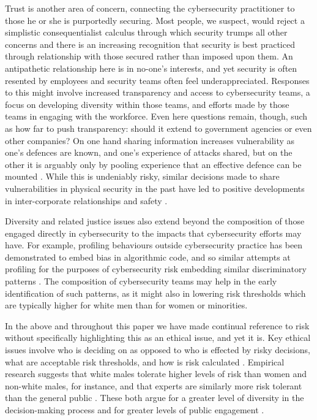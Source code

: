 \documentclass{svjour3}                     %
\begin{document}
Trust is another area of concern, connecting the cybersecurity practitioner to those he or she is purportedly securing. Most people, we suspect, would reject a simplistic consequentialist calculus through which security trumps all other concerns and there is an increasing recognition that security is best practiced through relationship with those secured rather than imposed upon them. An antipathetic relationship here is in no-one’s interests, and yet security is often resented by employees and security teams often feel underappreciated. Responses to this might involve increased transparency and access to cybersecurity teams, a focus on developing diversity within those teams, and efforts made by those teams in engaging with the workforce. Even here questions remain, though, such as how far to push transparency: should it extend to government agencies or even other companies? On one hand sharing information increases vulnerability as one’s defences are known, and one’s experience of attacks shared, but on the other it is arguably only by pooling experience that an effective defence can be mounted \cite[p.89--111]{guiora2017cybersecurity}. While this is undeniably risky, similar decisions made to share vulnerabilities in physical security in the past have led to positive developments in inter-corporate relationships and safety \cite{turnbull15ethics}.

Diversity and related justice issues also extend beyond the composition of those engaged directly in cybersecurity to the impacts that cybersecurity efforts may have. For example, profiling behaviours outside cybersecurity practice has been demonstrated to embed bias in algorithmic code, and so similar attempts at profiling for the purposes of cybersecurity risk embedding similar discriminatory patterns \cite{macnish2012unblinking}. The composition of cybersecurity teams may help in the early identification of such patterns, as it might also in lowering risk thresholds which are typically higher for white men than for women or minorities.

In the above and throughout this paper we have made continual reference to risk without specifically highlighting this as an ethical issue, and yet it is. Key ethical issues involve who is deciding on as opposed to who is effected by risky decisions, what are acceptable risk thresholds, and how is risk calculated \cite{hansson2013ethics}. Empirical research suggests that white males tolerate higher levels of risk than women and non-white males, for instance, and that experts are similarly more risk tolerant than the general public \cite{hermansson2010towards}. These both argue for a greater level of diversity in the decision-making process and for greater levels of public engagement \cite[p.120--128]{robinson2011ethical}.
\end{document}
